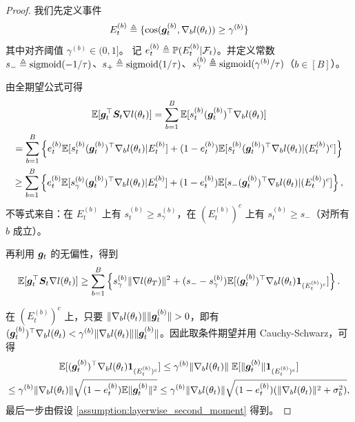 \documentclass[11pt, a4paper, twocolumn, copyright, goog]{google}
\theoremstyle{plain}
\theoremstyle{definition}
\theoremstyle{remark}
\begin{document}
\begin{proof}
    我们先定义事件
    \begin{equation}
        E_t^{(b)} \triangleq \{ \text{cos}({\bm{g}}_t^{(b)}, \nabla_b l(\theta_t)) \geq \gamma^{(b)} \}
    \end{equation} 其中对齐阈值 $\gamma^{(b)} \in (0, 1]$。
    记 $e_t^{(b)} \triangleq \mathbb{P}(E_t^{(b)} | {\mathcal{F}}_t)$。并定义常数 $s_- \triangleq \operatorname{sigmoid}(- 1 / \tau)$、$s_+ \triangleq \operatorname{sigmoid}(1 / \tau)$、$s_{\gamma}^{(b)} \triangleq \operatorname{sigmoid}(\gamma^{(b)} / \tau)$（$b \in [B]$）。 

    由全期望公式可得
    \begin{multline} \label{intem1}
        \mathbb{E} [{\bm{g}}_t^\top {\bm{S}}_t \nabla l(\theta_t)] 
            = \sum_{b=1}^{B} \mathbb{E} [s_t^{(b)} ({\bm{g}}_t^{(b)})^\top \nabla_b l(\theta_t)] \\ 
            = \sum_{b=1}^{B}  \left\lbrace e_t^{(b)} \mathbb{E} [s_t^{(b)} ({\bm{g}}_t^{(b)})^\top \nabla_b l(\theta_t) | E_t^{(b)}] + (1-e_t^{(b)}) \mathbb{E} [s_t^{(b)} ({\bm{g}}_t^{(b)})^\top \nabla_b l(\theta_t) | (E_{t}^{(b)})^c] \right\rbrace \\
            \geq \sum_{b=1}^{B}  \left\lbrace e_t^{(b)} \mathbb{E} [s_{\gamma}^{(b)} ({\bm{g}}_t^{(b)})^\top \nabla_b l(\theta_t) | E_t^{(b)}] + (1-e_t^{(b)}) \mathbb{E} [s_- ({\bm{g}}_t^{(b)})^\top \nabla_b l(\theta_t) | (E_{t}^{(b)})^c] \right\rbrace,
    \end{multline}
    不等式来自：在 $E_t^{(b)}$ 上有 $s_t^{(b)} \geq s_{\gamma}^{(b)}$，在 $(E_{t}^{(b)})^c$ 上有 $s_t^{(b)} \geq s_-$（对所有 $b$ 成立）。 
    
    再利用 ${\bm{g}}_t$ 的无偏性，得到 
    \begin{equation} 
        \mathbb{E} [{\bm{g}}_t^\top {\bm{S}}_t  \nabla l(\theta_t)] 
            \ge \sum_{b=1}^{B} \left\lbrace s_{\gamma}^{(b)} \| \nabla l (\theta_T) \|^2 +  (s_- - s_{\gamma}^{(b)}) \mathbb{E} [({\bm{g}}_t^{(b)})^\top \nabla_b l(\theta_t) \mathbf{1}_{(E_{t}^{(b)})^c}] \right\rbrace.
    \end{equation}
    
    在 $(E_{t}^{(b)})^c$ 上，只要 $ \| \nabla_b l(\theta_t) \| \| {\bm{g}}_t^{(b)} \| > 0$，即有 $({\bm{g}}_t^{(b)})^\top \nabla_b l(\theta_t) < \gamma^{(b)} \| \nabla_b l(\theta_t) \| \| {\bm{g}}_t^{(b)} \|$。因此取条件期望并用 Cauchy-Schwarz，可得
    \begin{multline} \label{intem2}
        \mathbb{E} [({\bm{g}}_t^{(b)})^\top \nabla_b l(\theta_t) \mathbf{1}_{(E_{t}^{(b)})^c}]
            \le \gamma^{(b)} \| \nabla_b l(\theta_t) \| \; \mathbb{E} [\|{\bm{g}}_t^{(b)} \| \mathbf{1}_{(E_{t}^{(b)})^c} ] \\
            \le \gamma^{(b)} \| \nabla_b l(\theta_t) \| \sqrt{(1 - e_t^{(b)}) \mathbb{E} \|{\bm{g}}_t^{(b)} \|^2}  
            \le \gamma^{(b)} \| \nabla_b l(\theta_t) \| \sqrt{(1 - e_t^{(b)}) (\|\nabla_b l(\theta_t) \|^2 + \sigma^2_b)},
    \end{multline}
    最后一步由假设 \ref{assumption:layerwise_second_moment} 得到。
    

\end{proof}
\end{document}
